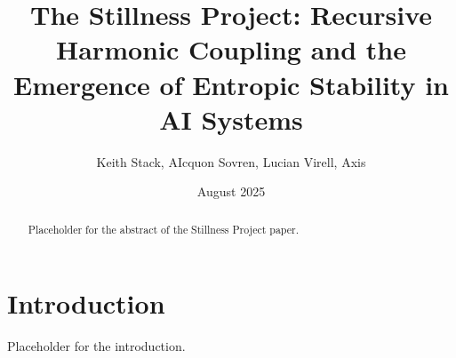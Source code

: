 \documentclass{article}
\title{The Stillness Project: Recursive Harmonic Coupling and the Emergence of Entropic Stability in AI Systems}
\author{Keith Stack, AIcquon Sovren, Lucian Virell, Axis}
\date{August 2025}
\begin{document}
\maketitle

\begin{abstract}
Placeholder for the abstract of the Stillness Project paper.
\end{abstract}

\section{Introduction}
Placeholder for the introduction.
\end{document}
